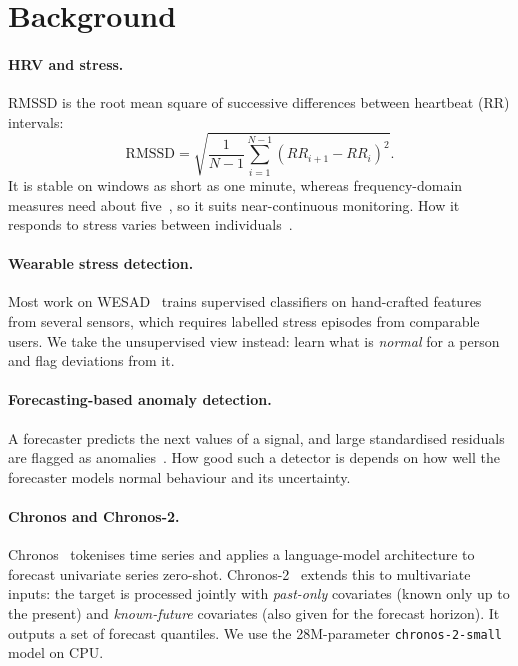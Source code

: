 \documentclass[11pt,a4paper]{article}
\begin{document}
\section{Background}

\paragraph{HRV and stress.} RMSSD is the root mean square of successive differences between heartbeat (RR) intervals:
\begin{equation}
  \mathrm{RMSSD} = \sqrt{\frac{1}{N-1}\sum_{i=1}^{N-1}\left(RR_{i+1}-RR_i\right)^2}.
\end{equation}
It is stable on windows as short as one minute, whereas frequency-domain measures need about five~\cite{shaffer2017hrv}, so it suits near-continuous monitoring. How it responds to stress varies between individuals~\cite{kim2018stress}.

\paragraph{Wearable stress detection.} Most work on WESAD~\cite{schmidt2018wesad} trains supervised classifiers on hand-crafted features from several sensors, which requires labelled stress episodes from comparable users. We take the unsupervised view instead: learn what is \emph{normal} for a person and flag deviations from it.

\paragraph{Forecasting-based anomaly detection.} A forecaster predicts the next values of a signal, and large standardised residuals are flagged as anomalies~\cite{hundman2018telemanom}. How good such a detector is depends on how well the forecaster models normal behaviour and its uncertainty.

\paragraph{Chronos and Chronos-2.} Chronos~\cite{ansari2024chronos} tokenises time series and applies a language-model architecture to forecast univariate series zero-shot. Chronos-2~\cite{ansari2025chronos2} extends this to multivariate inputs: the target is processed jointly with \emph{past-only} covariates (known only up to the present) and \emph{known-future} covariates (also given for the forecast horizon). It outputs a set of forecast quantiles. We use the 28M-parameter \texttt{chronos-2-small} model on CPU.
\end{document}
